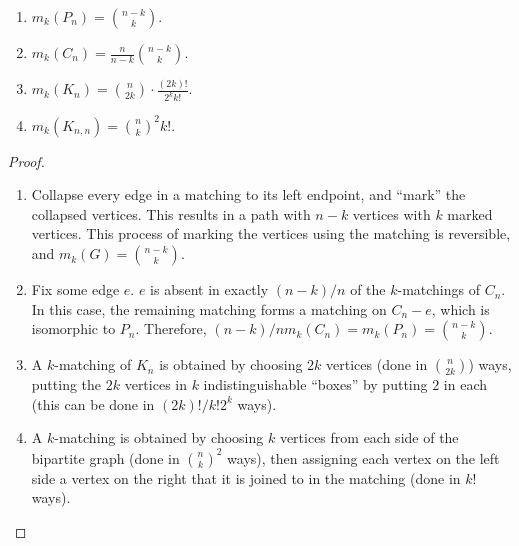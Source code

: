 	\begin{fprop}
		\phantom{pain}
		\begin{enumerate}
			\item $m_k(P_n) = \binom{n-k}{k}$.
			\item $m_k(C_n) = \frac{n}{n-k} \binom{n-k}{k}$.
			\item $m_k(K_n) = \binom{n}{2k} \cdot \frac{(2k)!}{2^kk!}$.
			\item $m_k(K_{n,n}) = \binom{n}{k}^2 k!$.
		\end{enumerate}
	\end{fprop}
	\begin{proof}
		\phantom{pain}
		\begin{enumerate}
			\item Collapse every edge in a matching to its left endpoint, and ``mark'' the collapsed vertices. This results in a path with $n-k$ vertices with $k$ marked vertices. This process of marking the vertices using the matching is reversible, and $m_k(G) = \binom{n-k}{k}$.
			\item Fix some edge $e$. $e$ is absent in exactly $(n-k)/n$ of the $k$-matchings of $C_n$. In this case, the remaining matching forms a matching on $C_n - e$, which is isomorphic to $P_n$. Therefore, $(n-k)/n m_k(C_n) = m_k(P_n) = \binom{n-k}{k}$.
			\item A $k$-matching of $K_n$ is obtained by choosing $2k$ vertices (done in $\binom{n}{2k}$) ways, putting the $2k$ vertices in $k$ indistinguishable ``boxes'' by putting $2$ in each (this can be done in $(2k)!/k!2^k$ ways).
			\item A $k$-matching is obtained by choosing $k$ vertices from each side of the bipartite graph (done in $\binom{n}{k}^2$ ways), then assigning each vertex on the left side a vertex on the right that it is joined to in the matching (done in $k!$ ways). \qedhere
		\end{enumerate}
	\end{proof}


